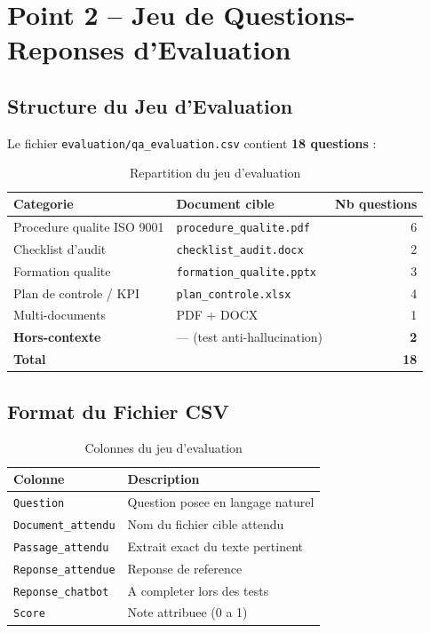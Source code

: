 \documentclass[12pt,a4paper]{article}
\begin{document}
\section{Point 2 -- Jeu de Questions-Reponses d'Evaluation}

\subsection{Structure du Jeu d'Evaluation}

Le fichier \texttt{evaluation/qa\_evaluation.csv} contient \textbf{18 questions} :

\begin{table}[h]
\centering
\caption{Repartition du jeu d'evaluation}
\begin{tabular}{llr}
\toprule
Categorie & Document cible & Nb questions \\
\midrule
Procedure qualite ISO 9001 & \texttt{procedure\_qualite.pdf} & 6 \\
Checklist d'audit & \texttt{checklist\_audit.docx} & 2 \\
Formation qualite & \texttt{formation\_qualite.pptx} & 3 \\
Plan de controle / KPI & \texttt{plan\_controle.xlsx} & 4 \\
Multi-documents & PDF + DOCX & 1 \\
\textbf{Hors-contexte} & --- (test anti-hallucination) & \textbf{2} \\
\midrule
\textbf{Total} & & \textbf{18} \\
\bottomrule
\end{tabular}
\end{table}

\subsection{Format du Fichier CSV}

\begin{table}[h]
\centering
\caption{Colonnes du jeu d'evaluation}
\begin{tabular}{lp{8cm}}
\toprule
\textbf{Colonne} & \textbf{Description} \\
\midrule
\texttt{Question} & Question posee en langage naturel \\
\texttt{Document\_attendu} & Nom du fichier cible attendu \\
\texttt{Passage\_attendu} & Extrait exact du texte pertinent \\
\texttt{Reponse\_attendue} & Reponse de reference \\
\texttt{Reponse\_chatbot} & A completer lors des tests \\
\texttt{Score} & Note attribuee (0 a 1) \\
\bottomrule
\end{tabular}
\end{table}
\end{document}
